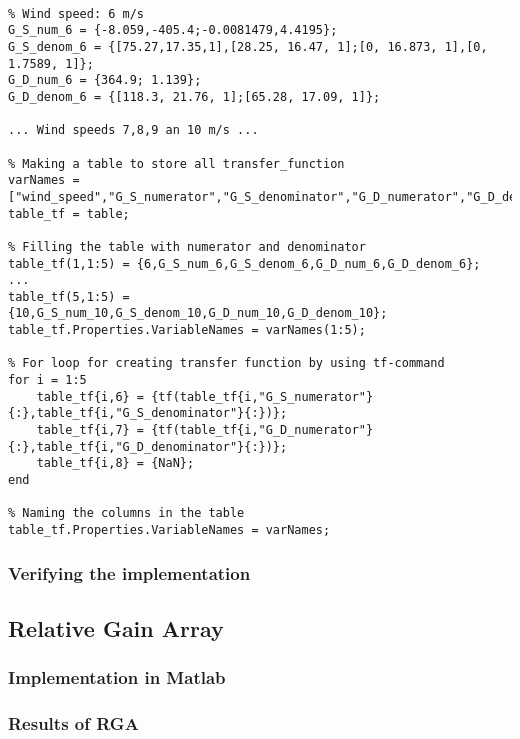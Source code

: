 \begin{lstlisting}[style=Matlab-editor,caption={},captionpos=b,label={list:analysis:tf}]

% Wind speed: 6 m/s
G_S_num_6 = {-8.059,-405.4;-0.0081479,4.4195};
G_S_denom_6 = {[75.27,17.35,1],[28.25, 16.47, 1];[0, 16.873, 1],[0, 1.7589, 1]};
G_D_num_6 = {364.9; 1.139};
G_D_denom_6 = {[118.3, 21.76, 1];[65.28, 17.09, 1]};

... Wind speeds 7,8,9 an 10 m/s ...

% Making a table to store all transfer_function
varNames = ["wind_speed","G_S_numerator","G_S_denominator","G_D_numerator","G_D_denominator","G_S","G_D","RGA"];
table_tf = table;

% Filling the table with numerator and denominator
table_tf(1,1:5) = {6,G_S_num_6,G_S_denom_6,G_D_num_6,G_D_denom_6};
...
table_tf(5,1:5) = {10,G_S_num_10,G_S_denom_10,G_D_num_10,G_D_denom_10};
table_tf.Properties.VariableNames = varNames(1:5);

% For loop for creating transfer function by using tf-command
for i = 1:5
    table_tf{i,6} = {tf(table_tf{i,"G_S_numerator"}{:},table_tf{i,"G_S_denominator"}{:})};
    table_tf{i,7} = {tf(table_tf{i,"G_D_numerator"}{:},table_tf{i,"G_D_denominator"}{:})};
    table_tf{i,8} = {NaN};
end

% Naming the columns in the table
table_tf.Properties.VariableNames = varNames;

\end{lstlisting}

\subsubsection{Verifying the implementation}

\subsection{Relative Gain Array}  \label{sec:analysis:RGA}

\subsubsection*{Implementation in Matlab}

\subsubsection*{Results of RGA}
